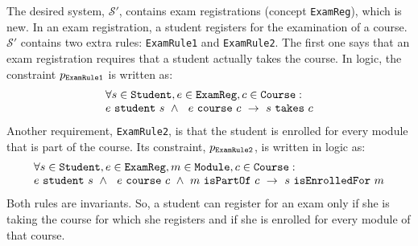 \documentclass[runningheads]{llncs}
\newcommand{\id}[1]{\text{\it #1\/}}
\newcommand{\viol}[2]{\violC{#1}(#2)}
\newcommand{\violC}[1]{\id{viol}_{#1}}
\newcommand{\pair}[2]{\langle{#1},{#2}\rangle}
\newcommand{\dataset}{\mathscr{D}}
\newcommand{\infsys}{\mathscr{S}}
\begin{document}
   The desired system, $\infsys'$, contains exam registrations (concept \verb-ExamReg-), which is new.
   In an exam registration, a student registers for the examination of a course.
   $\infsys'$ contains two extra rules: \verb-ExamRule1- and \verb-ExamRule2-.
   The first one says that an exam registration requires that a student actually takes the course.
   In logic, the constraint $p_{\tt ExamRule1}$ is written as:
\[\begin{array}{l}\forall s\in\text{\tt Student}, e\in\text{\tt ExamReg}, c\in\text{\tt Course}:\\
   e\ \text{\tt student}\ s\ \wedge\ \ e\ \text{\tt course}\ c\ \rightarrow\ s\ \text{\tt takes}\ c\\
\end{array}\]
   Another requirement, \verb-ExamRule2-, is that the student is enrolled for every module that is part of the course.
   Its constraint, $p_{\tt ExamRule2}$, is written in logic as:
\[\begin{array}{l}\forall s\in\text{\tt Student}, e\in\text{\tt ExamReg}, m\in\text{\tt Module}, c\in\text{\tt Course}:\\
   e\ \text{\tt student}\ s\ \wedge\ \ e\ \text{\tt course}\ c\ \wedge\ m\ \text{\tt isPartOf}\ c\ \rightarrow\ s\ \text{\tt isEnrolledFor}\ m
\end{array}\]
   Both rules are invariants.
   So, a student can register for an exam only if she is taking the course for which she registers and if she is enrolled for every module of that course.
\end{document}

